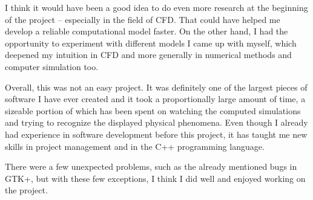 \documentclass[11pt,a4paper,twoside,openright]{report}
\let\openright=\cleardoublepage
\begin{document}
I think it would have been a good idea to do even more research at the beginning of the project -- especially in the field of CFD. That could have helped me develop a reliable computational model faster. On the other hand, I had the opportunity to experiment with different models I came up with myself, which deepened my intuition in CFD and more generally in numerical methods and computer simulation too.

Overall, this was not an easy project. It was definitely one of the largest pieces of software I have ever created and it took a proportionally large amount of time, a sizeable portion of which has been spent on watching the computed simulations and trying to recognize the displayed physical phenomena. Even though I already had experience in software development before this project, it has taught me new skills in project management and in the C++ programming language.

There were a few unexpected problems, such as the already mentioned bugs in GTK+, but with these few exceptions, I think I did well and enjoyed working on the project.

\printbibliography[title={Bibliography},heading={bibintoc}]

\openright
\listoffigures
{}



\end{document}
